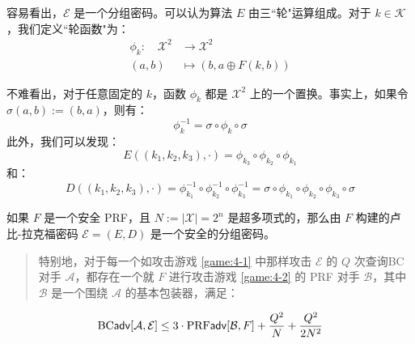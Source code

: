 容易看出，$\mathcal{E}$ 是一个分组密码。可以认为算法 $E$ 由三``轮"运算组成。对于 $k\in\mathcal{K}$，我们定义``轮函数"为：
\[
\begin{aligned}
\phi_k:\quad\mathcal{X}^2 & \to \mathcal{X}^2\\
(a,b) & \mapsto (b,a\oplus F(k,b))
\end{aligned}
\]

不难看出，对于任意固定的 $k$，函数 $\phi_k$ 都是 $\mathcal{X}^2$ 上的一个置换。事实上，如果令 $\sigma(a,b):=(b,a)$，则有：
\[
\phi_k^{-1}=\sigma\circ\phi_k\circ\sigma
\]
此外，我们可以发现：
\[
E((k_1,k_2,k_3),\cdot)=\phi_{k_3}\circ\phi_{k_2}\circ\phi_{k_1} 
\]
和：
\[
D((k_1,k_2,k_3),\cdot)=\phi^{-1}_{k_1}\circ\phi^{-1}_{k_2}\circ\phi^{-1}_{k_3}=\sigma\circ\phi_{k_1}\circ\phi_{k_2}\circ\phi_{k_3}\circ\sigma
\]

\begin{theorem}
如果 $F$ 是一个安全 PRF，且 $N:=|\mathcal{X}|=2^n$ 是超多项式的，那么由 $F$ 构建的卢比-拉克福密码 $\mathcal{E}=(E,D)$ 是一个安全的分组密码。
\begin{quote}
特别地，对于每一个如攻击游戏 \ref{game:4-1} 中那样攻击 $\mathcal{E}$ 的 $Q$ 次查询BC对手 $\mathcal{A}$，都存在一个就 $F$ 进行攻击游戏 \ref{game:4-2} 的 PRF 对手 $\mathcal{B}$，其中 $\mathcal{B}$ 是一个围绕 $\mathcal{A}$ 的基本包装器，满足：
\end{quote}
\[
{\rm BC\mathsf{adv}}[\mathcal{A},\mathcal{E}]\leq3\cdot{\rm PRF\mathsf{adv}}[\mathcal{B},F]+\frac{Q^2}{N}+\frac{Q^2}{2N^2}
\]
\end{theorem}

